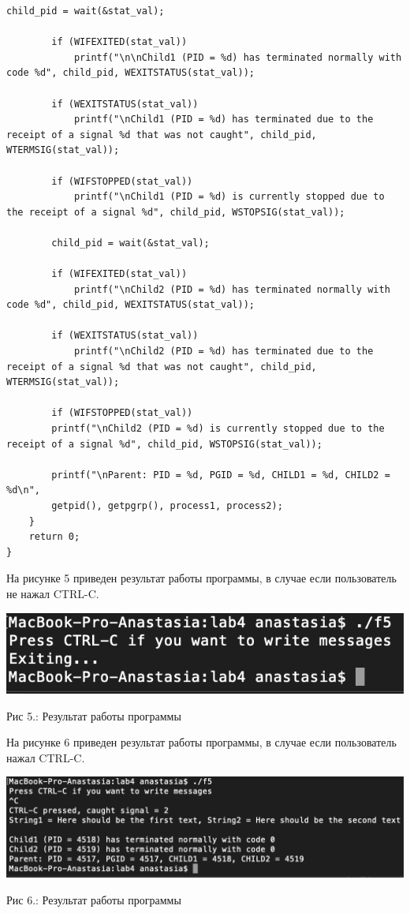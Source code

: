 \documentclass[12pt]{report}
\begin{document}
\begin{lstlisting}[label=some-code,caption=Задание 5]
        child_pid = wait(&stat_val);
        
        if (WIFEXITED(stat_val))
            printf("\n\nChild1 (PID = %d) has terminated normally with code %d", child_pid, WEXITSTATUS(stat_val));
        
        if (WEXITSTATUS(stat_val))
            printf("\nChild1 (PID = %d) has terminated due to the receipt of a signal %d that was not caught", child_pid, WTERMSIG(stat_val));
    
        if (WIFSTOPPED(stat_val))
            printf("\nChild1 (PID = %d) is currently stopped due to the receipt of a signal %d", child_pid, WSTOPSIG(stat_val));
        
        child_pid = wait(&stat_val);
        
        if (WIFEXITED(stat_val))
            printf("\nChild2 (PID = %d) has terminated normally with code %d", child_pid, WEXITSTATUS(stat_val));
        
        if (WEXITSTATUS(stat_val))
            printf("\nChild2 (PID = %d) has terminated due to the receipt of a signal %d that was not caught", child_pid, WTERMSIG(stat_val));
    
        if (WIFSTOPPED(stat_val))
        printf("\nChild2 (PID = %d) is currently stopped due to the receipt of a signal %d", child_pid, WSTOPSIG(stat_val));
         
        printf("\nParent: PID = %d, PGID = %d, CHILD1 = %d, CHILD2 = %d\n",
        getpid(), getpgrp(), process1, process2);
    }
    return 0;
}
\end{lstlisting}

На рисунке 5 приведен результат работы программы, в случае если пользователь не нажал CTRL-C.
\begin{center}
		\includegraphics[scale=0.8]{pics/proc5.png}
		
			Рис 5.:  Результат работы программы
\end{center}

На рисунке 6 приведен результат работы программы, в случае если пользователь нажал CTRL-C.
\begin{center}
		\includegraphics[scale=0.8]{pics/proc6.png}
		
			Рис 6.:  Результат работы программы
\end{center}
\end{document}
